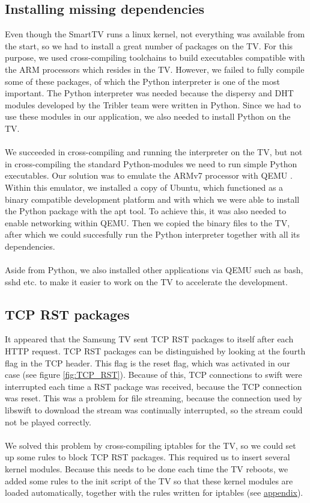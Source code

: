 \subsection{Installing missing dependencies}
Even though the SmartTV runs a linux kernel, not everything was available from the start, so we had to install a great number of packages on the TV.
For this purpose, we used cross-compiling toolchains to build executables compatible with the ARM \cite{arm} processors which resides in the TV. However, we failed
to fully compile some of these packages, of which the Python interpreter is one of the most important. The Python interpreter was needed because the dispersy and DHT modules 
developed by the Tribler team were written in Python. Since we had to use these modules in our application, we also needed to install Python on the TV. 
\\\\
We succeeded in cross-compiling and running the interpreter on the TV, but not in cross-compiling the standard Python-modules we need to run simple Python executables.
Our solution was to emulate the ARMv7 processor with QEMU \cite{qemu}. Within this emulator, we installed a copy of Ubuntu, \cite{ubuntu} which functioned as a binary compatible development platform and with which we were able to install the Python package with the apt tool.
To achieve this, it was also needed to enable networking within QEMU. \cite{qemu-network} Then we copied the binary files to the TV, after which we could succesfully run the Python interpreter together with all its dependencies.
\\\\
Aside from Python, we also installed other applications via QEMU such as bash, sshd etc. to make it easier to work on the TV to accelerate the development.

\subsection{TCP RST packages}
It appeared that the Samsung TV sent TCP RST packages to itself after each HTTP request. TCP RST packages can be distinguished by looking at the fourth flag in the TCP header. This flag is the reset flag, which was activated in our case (see figure \ref{fig:TCP_RST}). Because of this, TCP connections to swift were interrupted each time a RST package was received, because the TCP connection was reset. This was a problem for file streaming, because the connection used by libswift to download the stream was continually interrupted, so the stream could not be played correctly. 
\\\\
We solved this problem by cross-compiling iptables\cite{iptables} for the TV, so we could set up some rules to block TCP RST packages. This required us to insert several kernel modules. Because this needs to be done each time the TV reboots, we added some rules to the init script of the TV so that these kernel modules are loaded automatically, together with the rules written for iptables (see \hyperref[sec:vusb_init]{appendix}).

